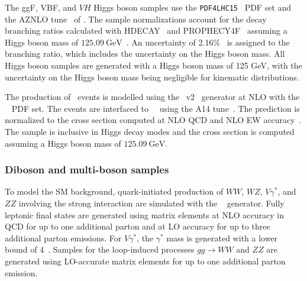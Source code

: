 The ggF, VBF, and $VH$ Higgs boson samples use the \texttt{PDF4LHC15}~\cite{Butterworth:2015oua} PDF set and the AZNLO tune~\cite{STDM-2012-23} of . The sample normalizations account for the decay branching ratios calculated with \textsc{HDECAY}~\cite{Djouadi:1997yw, Spira:1997dg, Djouadi:2006bz} and \textsc{PROPHECY4F}~\cite{Bredenstein:2006ha, Bredenstein:2006rh, Bredenstein:2006nk} assuming a Higgs boson mass of $\SI{125.09}{\GeV}$~\cite{HIGG-2014-14}. An uncertainty of 2.16\%~\cite{deFlorian:2016spz} is assigned to the \hww branching ratio, which includes the uncertainty on the Higgs boson mass. All Higgs boson samples are generated with a Higgs boson mass of 125 GeV, with the uncertainty on the Higgs boson mass being negligible for kinematic distributions.

The production of \ttH\ events is modelled using the \powhegbox~v2~\cite{Frixione:2007nw,Nason:2004rx,Frixione:2007vw,Alioli:2010xd,Hartanto:2015uka} generator at NLO with the \nnpdfnlo~\cite{Ball:2014uwa} PDF set.
The events are interfaced to ~\cite{Sjostrand:2014zea}~using the A14 tune~\cite{ATL-PHYS-PUB-2014-021}.
The prediction is normalized to the cross section computed at NLO QCD and NLO EW accuracy~\cite{deFlorian:2016spz}.
The sample is inclusive in Higgs decay modes and the cross section is computed assuming a Higgs boson mass of $\SI{125.09}{\GeV}$.


\subsubsection{Diboson and multi-boson samples}

To model the SM background, quark-initiated production of $WW$, $WZ$, $V\gamma^{\ast}$, and $ZZ$ involving the strong interaction are simulated with the ~\cite{Bothmann:2019yzt} generator.
Fully leptonic final states are generated using matrix elements at NLO accuracy in QCD for up to one additional parton and at LO accuracy for up to three additional parton emissions.
For $V\gamma^{\ast}$, the $\gamma^{\ast}$ mass is generated with a lower bound of 4~\GeV.
Samples for the loop-induced processes $gg \to WW$ and $ZZ$ are generated using LO-accurate matrix elements for up to one additional parton emission.

